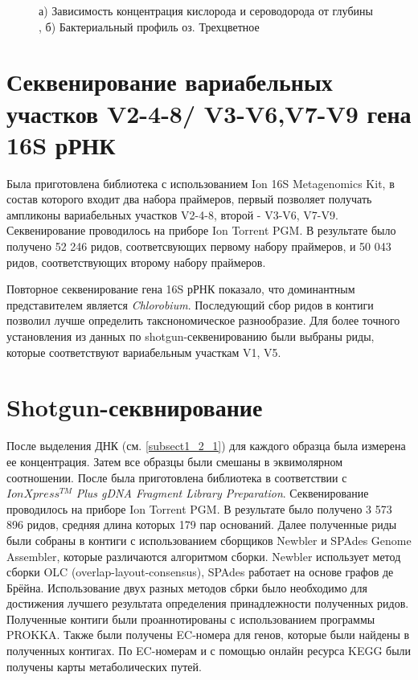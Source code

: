 \begin{figure}[h]
\begin{minipage}[h]{0.5\linewidth}
\end{minipage}
\hfill
\begin{minipage}[h]{0.5\linewidth}
\end{minipage}
\caption{а) Зависимость концентрация кислорода и сероводорода от глубины , б) Бактериальный профиль оз. Трехцветное}
\label{ris:concentr, 3cvet}
\end{figure}

\section{Секвенирование вариабельных участков V2-4-8/ V3-V6,V7-V9 гена 16S рРНК} \label{sect2_2}

Была приготовлена библиотека с использованием  Ion 16S Metagenomics Kit, в состав которого входит два набора праймеров, первый позволяет получать ампликоны вариабельных участков V2-4-8, второй - V3-V6, V7-V9. Секвенирование проводилось на приборе Ion Torrent PGM. В результате было получено 52 246 ридов, соответсвующих первому набору праймеров, и 50 043 ридов, соответствующих второму набору праймеров. 

Повторное секвенирование гена 16S рРНК показало, что доминантным представителем является \textit{Chlorobium}. Последующий сбор ридов в контиги позволил лучше определить такснономическое разнообразие. Для более точного установления из данных по shotgun-секвенированию были выбраны риды, которые соответствуют вариабельным участкам V1, V5. 

\section{Shotgun-секвнирование}
После выделения ДНК (см. \ref{subsect1_2_1}) для каждого образца была измерена ее концентрация. Затем все образцы были смешаны в эквимолярном соотношении. После была приготовлена библиотека в соответствии с $IonXpress^{TM}$ \textit{Plus gDNA Fragment Library Preparation}. Секвенирование проводилось на приборе Ion Torrent PGM. В результате было получено 3 573 896 ридов, средняя длина которых 179 пар оснований. Далее полученные риды были собраны в контиги с использованием  сборщиков Newbler и SPAdes Genome Assembler, которые различаются алгоритмом сборки. Newbler использует метод сборки OLC (overlap-layout-consensus), SPAdes работает на основе графов де Брёйна. Использование двух разных методов сбрки было необходимо для достижения лучшего результата определения принадлежности полученных ридов. Полученные контиги были проаннотированы с использованием программы PROKKA. Также были получены EC-номера для генов, которые были найдены в полученных контигах. По EC-номерам и с помощью онлайн ресурса KEGG были получены карты метаболических путей. 

